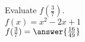 \documentclass{ximera}
\author{David Kish}
\begin{document}
\begin{exercise}
Evaluate $f(\frac{3}{7})$.\\
$f(x)= x^2- 2x+1$\\
$f(\frac{3}{7})= \answer{\frac{16}{49}}$
\end{exercise}
\end{document}
